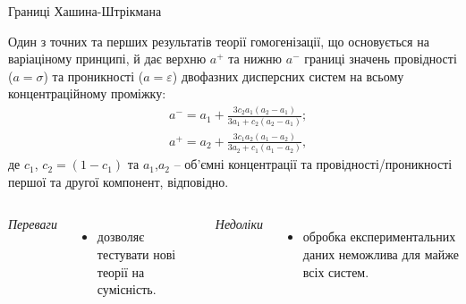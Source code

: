 \documentclass[10pt]{beamer}
\begin{document}
\begin{frame}{Границі Хашина-Штрікмана}

\footnotesize
    Один з точних та перших результатів теорії гомогенізації, що основується на варіаціному принципі, й дає верхню $a^{+}$ та нижню $a^{-}$ границі значень провідності ($a=\sigma$) та проникності ($a=\varepsilon$) двофазних дисперсних систем на всьому концентраційному проміжку:
    \begin{equation}\label{eq:HS-bounds}
    \begin{split}
    	&a^{-} = a_1 + \frac{3c_2 a_1(a_2-a_1)}{3a_1 + c_2(a_2-a_1)};\\
    	&a^{+} = a_2 + \frac{3c_1 a_2(a_1-a_2)}{3a_2 + c_1(a_1-a_2)},
    \end{split}
    \end{equation}
    де $c_{1}$, $c_2=(1-c_1)$ та $a_{1}$,$a_{2}$ -- об'ємні концентрації та провідності/проникності першої та другої компонент, відповідно.\par
    [Z. Hashin and S. Shtrikman, J. Appl. Phys. {\bf 33} (1962) 3125]
    \vspace{-5pt}
    \begin{columns}[T,onlytextwidth]
          \begin{center}
          {\it Переваги}
          \end{center}
          \vspace{-10pt}
          \begin{itemize}
              \item дозволяє тестувати нові теорії на сумісність.
          \end{itemize}
    
          \begin{center}
          {\it Недоліки}
          \end{center}
          \vspace{-10pt}
          \begin{itemize}
              \item обробка експериментальних даних неможлива для майже всіх систем.
          \end{itemize}
    \end{columns}
  
\end{frame}

\end{document}
